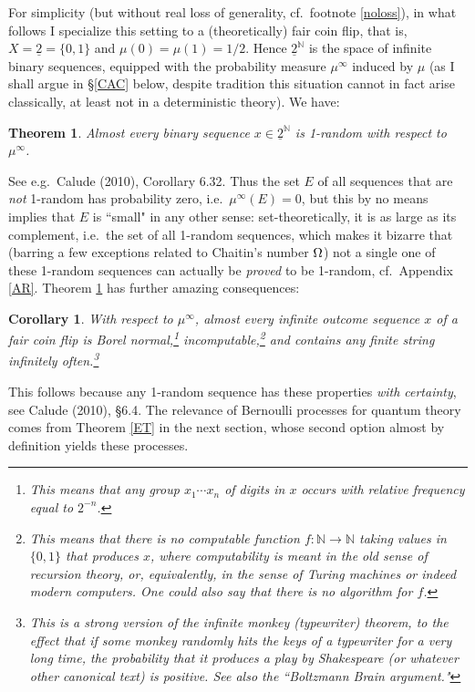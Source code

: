 \documentclass[12pt]{article}
\numberwithin{equation}{section}
\newcommand{\ul}{\underline}
\newcommand{\raw}{\rightarrow}
\newcommand{\N}{{\mathbb N}} \newcommand{\R}{{\mathbb R}}
\newtheorem{theorem}[definition]{Theorem}
\newtheorem{corollary}[definition]{Corollary}
\begin{document}
For simplicity (but without real loss of generality, cf.\  footnote \ref{noloss}), in what follows I specialize this setting to a (theoretically) fair coin flip, that is, $X=\ul{2}=\{0,1\}$ and $\mu(0)=\mu(1)=1/2$. Hence $\ul{2}^{\N}$ is the space of infinite binary sequences, equipped with the probability measure $\mu^{\infty}$ induced by $\mu$ (as I shall argue in \S\ref{CAC} below, despite tradition this situation cannot in fact arise classically, at least not in a deterministic theory). We have:
 \begin{theorem}\label{thm:3.1}
 Almost every binary sequence $x\in\ul{2}^{\N}$ is 1-random with respect to $\mu^{\infty}$.
  \end{theorem}
 See e.g.\ Calude (2010), Corollary 6.32. Thus the set $E$ of all sequences that are \emph{not} 1-random has probability zero, i.e.\ $\mu^{\infty}(E)=0$, but this by no means implies that $E$ is ``small" in any other sense: set-theoretically, it is as large as its complement, i.e.\ the set of all 1-random sequences, which makes it bizarre that (barring a few exceptions related to Chaitin's number $\Omega$) not a single one of these  1-random sequences can actually be \emph{proved} to be 1-random, cf.\ Appendix \ref{AR}. Theorem \ref{thm:3.1} has further amazing consequences:
  \begin{corollary}\label{CC}
 With respect to $\mu^{\infty}$, almost every infinite outcome sequence $x$ of a  fair coin flip
 is Borel normal,\footnote{This means that any group $x_1 \cdots x_n$ of digits in $x$ occurs with relative frequency equal to $2^{-n}$. }
 incomputable,\footnote{This means that there is no computable function $f:\N\raw\N$ taking values in $\{0,1\}$ that produces $x$, where computability is meant in the old sense of recursion theory, or, equivalently, in the sense of Turing machines or indeed modern computers. One could also say that there is no algorithm for $f$.} 
  and contains any finite string infinitely often.\footnote{This is a strong version of the \emph{infinite monkey (typewriter) theorem}, to the effect that if some monkey randomly hits the keys of a typewriter for a very long time, the probability that it produces a play by Shakespeare (or whatever other canonical text) is positive. See also the ``Boltzmann Brain argument." }
 \end{corollary}
 This follows because any 1-random sequence has these properties \emph{with certainty}, see Calude (2010), \S 6.4. 
 The relevance of Bernoulli processes for quantum theory comes from Theorem \ref{ET} in the next section, whose second option almost by definition yields these processes.
\end{document}
